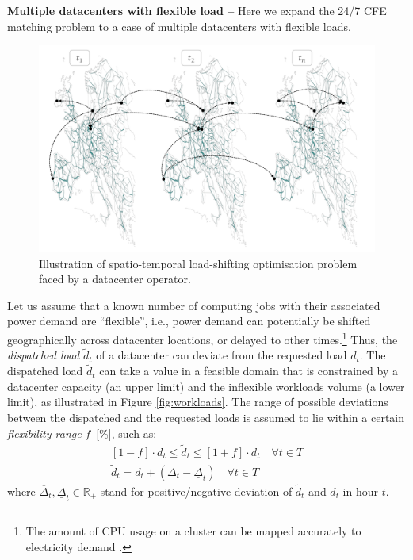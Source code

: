 \textbf{Multiple datacenters with flexible load --} Here we expand the 24/7 CFE matching problem to a case of multiple datacenters with flexible loads.

\begin{figure}
    \centering
    \includegraphics[width=1\columnwidth]{img/datacenter-problem.png}
    \caption{Illustration of spatio-temporal load-shifting optimisation problem faced by a datacenter operator.}
    \label{fig:space-time-optimisation}
\end{figure}

Let us assume that a known number of computing jobs with their associated power demand are \enquote{flexible}, i.e., power demand can potentially be shifted geographically across datacenter locations, or delayed to other times.\footnote{The amount of CPU usage on a cluster can be mapped accurately to electricity demand \cite{radovanovicIEEE2023}.} Thus, the \textit{dispatched load} $\widetilde{d}_t$ of a datacenter can deviate from the requested load $d_t$. The dispatched load $\widetilde{d}_t$ can take a value in a feasible domain that is constrained by a datacenter capacity (an upper limit) and the inflexible workloads volume (a lower limit), as illustrated in Figure \ref{fig:workloads}. The range of possible deviations between the dispatched and the requested loads is assumed to lie within a certain \textit{flexibility range} $f$~[\%], such as:
\begin{subequations}
  \begin{align}
    [1-f] \cdot d_t \le  \widetilde{d}_t  \le [1+f] \cdot d_t \quad \forall t \in T
    \label{eqn:dcaps} \\
    \widetilde{d}_t = d_t + (\overline{\Delta}_t - \underline{\Delta}_t) \quad \forall t \in T
    \label{eqn:dtilde}
  \end{align}
  \label{eqn:range}
\end{subequations}
\noindent where $\overline{\Delta}_t, \underline{\Delta}_t \in \mathbb{R}_{+}$ stand for positive/negative deviation of $\widetilde{d}_t$ and $d_t$ in hour $t$.

